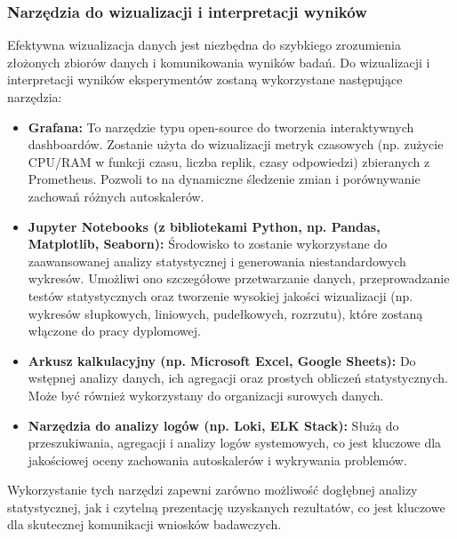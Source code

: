 \subsubsection{Narzędzia do wizualizacji i interpretacji wyników}
Efektywna wizualizacja danych jest niezbędna do szybkiego zrozumienia złożonych zbiorów danych i komunikowania wyników badań. Do wizualizacji i interpretacji wyników eksperymentów zostaną wykorzystane następujące narzędzia:

\begin{itemize}
    \item \textbf{Grafana:} To narzędzie typu open-source do tworzenia interaktywnych dashboardów. Zostanie użyta do wizualizacji metryk czasowych (np. zużycie CPU/RAM w funkcji czasu, liczba replik, czasy odpowiedzi) zbieranych z Prometheus. Pozwoli to na dynamiczne śledzenie zmian i porównywanie zachowań różnych autoskalerów.
    \item \textbf{Jupyter Notebooks (z bibliotekami Python, np. Pandas, Matplotlib, Seaborn):} Środowisko to zostanie wykorzystane do zaawansowanej analizy statystycznej i generowania niestandardowych wykresów. Umożliwi ono szczegółowe przetwarzanie danych, przeprowadzanie testów statystycznych oraz tworzenie wysokiej jakości wizualizacji (np. wykresów słupkowych, liniowych, pudełkowych, rozrzutu), które zostaną włączone do pracy dyplomowej.
    \item \textbf{Arkusz kalkulacyjny (np. Microsoft Excel, Google Sheets):} Do wstępnej analizy danych, ich agregacji oraz prostych obliczeń statystycznych. Może być również wykorzystany do organizacji surowych danych.
    \item \textbf{Narzędzia do analizy logów (np. Loki, ELK Stack):} Służą do przeszukiwania, agregacji i analizy logów systemowych, co jest kluczowe dla jakościowej oceny zachowania autoskalerów i wykrywania problemów.
\end{itemize}
Wykorzystanie tych narzędzi zapewni zarówno możliwość dogłębnej analizy statystycznej, jak i czytelną prezentację uzyskanych rezultatów, co jest kluczowe dla skutecznej komunikacji wniosków badawczych.





